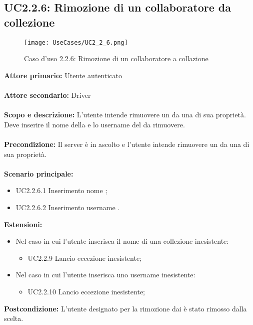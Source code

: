 \documentclass{scalatekids-article}
\begin{document}
\subsection{UC2.2.6: Rimozione di un collaboratore da collezione}
\begin{figure}[H]
  \begin{center}
    \texttt{[image: UseCases/UC2\_2\_6.png]}
    \caption*{Caso d'uso 2.2.6: Rimozione di un collaboratore a collazione}
  \end{center}
\end{figure}
\textbf{Attore primario:} Utente autenticato\\ \\
\textbf{Attore secondario:} Driver\\ \\
\textbf{Scopo e descrizione:} L'utente intende rimuovere un  da una  di sua proprietà. Deve inserire il nome della  e lo username del  da rimuovere.\\ \\
\textbf{Precondizione:} Il server è in ascolto e l'utente intende rimuovere un  da una  di sua proprietà.\\ \\
\textbf{Scenario principale:}
\begin{itemize}
\item UC2.2.6.1 Inserimento nome ;
\item UC2.2.6.2 Inserimento username .
\end{itemize}
\textbf{Estensioni:}
\begin{itemize}
\item Nel caso in cui l'utente inserisca il nome di una collezione inesistente:
  \begin{itemize}
  \item UC2.2.9 Lancio eccezione  inesistente;
  \end{itemize}
\item Nel caso in cui l'utente inserisca uno username inesistente:
  \begin{itemize}
  \item UC2.2.10 Lancio eccezione  inesistente;
  \end{itemize}
\end{itemize}
\textbf{Postcondizione:} L'utente designato per la rimozione dai  è stato rimosso dalla  scelta.
\end{document}

